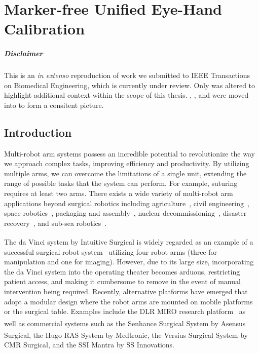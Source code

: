 \graphicspath{{chapter_1}}
\chapter[Marker-free Unified Eye-Hand Calibration]{Marker-free Unified Eye-Hand Calibration}
\label{chap:registration}
\minitoc

\paragraph{Disclaimer} This  is an \textit{in extenso} reproduction of work we submitted to IEEE Transactions on Biomedical Engineering, which is currently under review. Only  was altered to highlight additional context within the scope of this thesis. , , and  were moved into  to form a consitent picture.

\newpage

\section{Introduction}
\label{c1:sec:introduction}
Multi-robot arm systems possess an incredible potential to revolutionize the way we approach complex tasks, improving efficiency and productivity. 
By utilizing multiple arms, we can overcome the limitations of a single unit, extending the range of possible tasks that the system can perform. 
For example, suturing requires at least two arms.
There exists a wide variety of multi-robot arm applications beyond surgical robotics including 
agriculture~\cite{Xiong20}, 
civil engineering~\cite{Yasutomi23}, 
space robotics~\cite{Yan20},
packaging and assembly~\cite{Do12},
nuclear decommissioning~\cite{Mohamed07},
disaster recovery~\cite{Kamezaki16}, and
sub-sea robotics~\cite{Brantner21}.

The da Vinci\textsuperscript{\textregistered} system by Intuitive Surgical is widely regarded as an example of a successful surgical robot system~\cite{yang2018grand, DEttorre2021} utilizing four robot arms (three for manipulation and one for imaging).
However, due to its large size, incorporating the da Vinci system into the operating theater becomes arduous, restricting patient access, and making it cumbersome to remove in the event of manual intervention being required.
Recently, alternative platforms have emerged that adopt a modular design where the robot arms are mounted on mobile platforms or the surgical table. 
Examples include the 
DLR MIRO research platform~\citep{miro}
as well as commercial systems such as 
the Senhance\textsuperscript{\texttrademark} Surgical System by Asensus Surgical, 
the Hugo\textsuperscript{\texttrademark} RAS System by Medtronic, 
the Versius\textsuperscript{\textregistered} Surgical System by CMR Surgical, and 
the SSI Mantra by SS Innovations.

